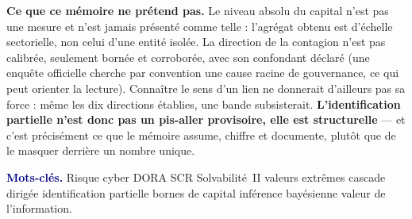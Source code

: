 \documentclass[10pt,a4paper]{article}
\begin{document}
\begin{cle}[colback=accent!7,colframe=accent!70!black]
\textbf{Ce que ce mémoire ne prétend pas.} Le niveau absolu du capital n'est pas une mesure et
n'est jamais présenté comme telle : l'agrégat obtenu est d'échelle sectorielle, non celui d'une
entité isolée. La direction de la contagion n'est pas calibrée, seulement bornée et corroborée,
avec son confondant déclaré (une enquête officielle cherche par convention une cause racine de
gouvernance, ce qui peut orienter la lecture). Connaître le sens d'un lien ne donnerait d'ailleurs
pas sa force : même les dix directions établies, une bande subsisterait. \textbf{L'identification
partielle n'est donc pas un pis-aller provisoire, elle est structurelle} --- et c'est précisément
ce que le mémoire assume, chiffre et documente, plutôt que de le masquer derrière un nombre unique.
\end{cle}

\vspace{-1pt}
{\footnotesize\textcolor{navy}{\textbf{Mots-clés.}} Risque cyber \textbullet{} DORA \textbullet{}
SCR \textbullet{} Solvabilité~II \textbullet{} valeurs extrêmes \textbullet{} cascade dirigée
\textbullet{} identification partielle \textbullet{} bornes de capital \textbullet{} inférence
bayésienne \textbullet{} valeur de l'information.}
\end{document}
